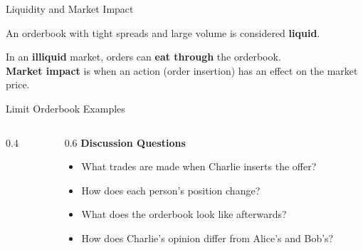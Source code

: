 \begin{frame}{Liquidity and Market Impact}
  \begin{sqt:definition}
    An orderbook with tight spreads and large volume is considered \textbf{liquid}.
  \end{sqt:definition}

  In an \textbf{illiquid} market, orders can \textbf{eat through} the orderbook.\\
  \textbf{Market impact} is when an action (order insertion) has an effect on the market price.

  \begin{center}
    
  \end{center}
\end{frame}

\begin{frame}{Limit Orderbook Examples}
  \begin{columns}[T]
    \begin{column}{0.4\textwidth}
      
    \end{column}

    \begin{column}{0.6\textwidth}
      \textbf{Discussion Questions}
      \begin{itemize}
        \item What trades are made when Charlie inserts the offer?
        \item How does each person's position change?
        \item What does the orderbook look like afterwards?
        \item How does Charlie's opinion differ from Alice's and Bob's?
      \end{itemize}
    \end{column}
  \end{columns}

\end{frame}
